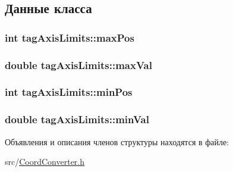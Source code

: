 \subsection{Данные класса}
\hypertarget{structtag_axis_limits_a278c6398cff218e2b0d361a27cc48d52}{
\subsubsection[{max\-Pos}]{\setlength{\rightskip}{0pt plus 5cm}int tag\-Axis\-Limits\-::max\-Pos}}\label{structtag_axis_limits_a278c6398cff218e2b0d361a27cc48d52}
\hypertarget{structtag_axis_limits_ae550302cf4abe7ca5cb3ff6bc311a305}{
\subsubsection[{max\-Val}]{\setlength{\rightskip}{0pt plus 5cm}double tag\-Axis\-Limits\-::max\-Val}}\label{structtag_axis_limits_ae550302cf4abe7ca5cb3ff6bc311a305}
\hypertarget{structtag_axis_limits_adb6a574ead738985f922f6b5ad0a18d9}{
\subsubsection[{min\-Pos}]{\setlength{\rightskip}{0pt plus 5cm}int tag\-Axis\-Limits\-::min\-Pos}}\label{structtag_axis_limits_adb6a574ead738985f922f6b5ad0a18d9}
\hypertarget{structtag_axis_limits_a2ff24b523fb98cbe0a00bde3e0210f7c}{
\subsubsection[{min\-Val}]{\setlength{\rightskip}{0pt plus 5cm}double tag\-Axis\-Limits\-::min\-Val}}\label{structtag_axis_limits_a2ff24b523fb98cbe0a00bde3e0210f7c}


Объявления и описания членов структуры находятся в файле\-:\begin{DoxyCompactItemize}
\item 
src/\hyperlink{_coord_converter_8h}{Coord\-Converter.\-h}\end{DoxyCompactItemize}
